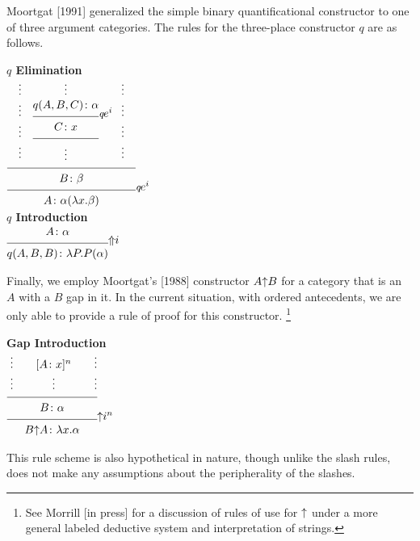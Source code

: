 Moortgat [1991] generalized the simple binary quantificational
constructor to one of three argument categories.  The rules for the
three-place constructor $q$ are as follows.
%
\begin{center}
{\bf $q$ Elimination} \\[6pt]
{\small
$\infr{\infr{\quad \sstc{\vdots \\ \vdots \\ \vdots \\ \vdots}
             \quad \infr{\infr{\dotsover{\synsem{q(A,B,C)}{\alpha}}}
                              {\synsem{C}{x}}
                              {\qqpush{i}}
                        }
                        {\vdots}
                        {}
             \qquad \sstc{\vdots \\ \vdots \\ \vdots \\ \vdots}
             \quad
            }
            {\synsem{B}{\beta}}
            {}
      }
      {\synsem{A}{\alpha(\lam{x}{\beta})}}
      {\qqpop{i}}$
}
\\[18pt]
{\bf $q$ Introduction} \\[6pt]
{\small
$\infr{\synsem{A}{\alpha}}
      {\synsem{q(A,B,B)}{\lam{P}{P(\alpha)}}}
      {\qintro}
$
}
\end{center}
%
Finally, we employ Moortgat's [1988] constructor $A {\uparrow} B$ for a
category that is an $A$ with a $B$ gap in it.  In the current
situation, with ordered antecedents, we are only able to provide a
rule of proof for this constructor.%
%
\footnote{See Morrill [in press] for a discussion of rules of use for
${\uparrow}$ under a more general labeled deductive system and
interpretation of strings.}
%
\begin{center}
{\bf Gap Introduction} \\[6pt]
{\small
$\infr{\infr{\; \sstc{\vdots \\ \vdots} 
             \qquad
             \sstc{\disch{\synsem{A}{x}}{n} 
                   \\
                   \vdots}
             \qquad
             \sstc{\vdots \\ \vdots}}
            {\synsem{B}{\alpha}}
            {}}
      {\synsem{\bang{B}{A}}{\lam{x}{\alpha}}}
      {\gin{n}}$
}
\end{center}
%
This rule scheme is also hypothetical in nature, though unlike the
slash rules, does not make any assumptions about the peripherality of
the slashes.

